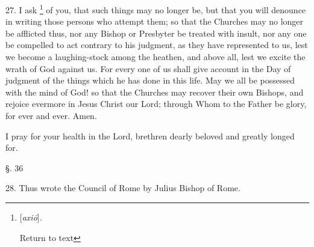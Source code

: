 27. I ask \footnote{[\emph{axi\={o}}].

Return to text} of you, that such things may no longer be, but that you will
denounce in writing those persons who attempt them; so that the
Churches may no longer be afflicted thus, nor any Bishop or Presbyter
be treated with insult, nor any one be compelled to act contrary to
his judgment, as they have represented to us, lest we become a
laughing-stock among the heathen, and above all, lest we excite the
wrath of God against us. For every one of us shall give account in the
Day of judgment of the things which he has done in this life. May we
all be possessed with the mind of God! so that the Churches may
recover their own Bishops, and rejoice evermore in Jesus Christ our
Lord; through Whom to the Father be glory, for ever and ever. Amen.

I pray for your health in the Lord, brethren
dearly beloved and greatly longed for.

§. 36

28. Thus wrote the Council of Rome by Julius
Bishop of Rome.


